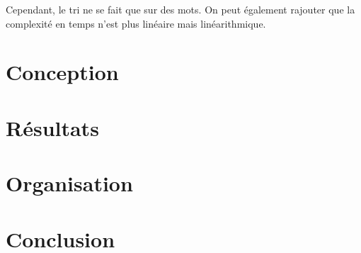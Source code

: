 \documentclass[12pt]{article}
\begin{document}
Cependant, le tri ne se fait que sur des mots. On peut également rajouter que la complexité en temps n'est plus linéaire mais linéarithmique. 

\newpage






\section{Conception}
\newpage 

\section{Résultats}
\newpage 
\section{Organisation}
\newpage 
\section{Conclusion}

\newpage
%
%
\end{document}
